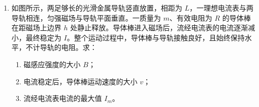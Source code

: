 \documentclass[\gkver]{gaokaozhenti}
\begin{document}
\begin{enumerate}
{（2）根据热力学第一定律 $\Delta U=W+Q$，第一阶段 $W_{1}=24\UkJ$，$\Delta U_{1}=0$，所以 $Q_{1}=-24\UkJ$，放热；第二阶段 $W_{2}=0$，放热 $Q_{2}=-5\UkJ$，所以 $\Delta U_{2}=-5\UkJ$。又 $\Delta U=\Delta U_{1}+\Delta U_{2}=-5\UkJ$，即内能减少 $5\UkJ$；$Q=Q_{1}+Q_{2}=-29\UkJ$，即放出热量 $29\UkJ$。

（3）设空气的摩尔质量为 $M$，在海底和岸上的密度分别为 $\rho_{\text{海}}$ 和 $\rho_{\text{岸}}$，一次吸入空气的体积为 $V$，则有 $\Delta n=\frac{(\rho_{\text{海}}-\rho_{\text{岸}})V}{M}N_{A}$，代入数据得 $\Delta n=3\times10^{22}$。

\textbf{B．}（1）测距利用的是平行度好的特点，答案 D。

（2）由于 $\frac{7.95}{5.30}=1.5$，路程差是半波长的奇数倍，所以是暗条纹。又 $\Delta x=\frac{l}{d}\lambda$，$\lambda$ 变大，$\Delta x$ 变大，条纹变宽。

（3）设折射角为 $\gamma$，由折射定律 $\frac{\sin i}{\sin\gamma}=n$；由几何关系 $l=2d\tan\gamma$，解得 $d=\frac{\sqrt{n^{2}-\sin^{2}i}}{2\sin i}l$。

\textbf{C．}（1）虽然 $I_{\text{强}}>I_{\text{弱}}$，但截止电压相等，选项 C 正确。

（2）减小；光电子受到金属表面层中力的阻碍作用（或需要克服逸出功）。

（3）氢原子放出的光子能量 $E=E_{3}-E_{2}$，代入数据得 $E=1.89\UeV$；金属钠的逸出功 $W_{0}=h\nu_{0}$，代入数据得 $W_{0}=2.3\UeV$。因为 $E<W_{0}$，所以不能发生光电效应。
}

\item
如图所示，两足够长的光滑金属导轨竖直放置，相距为 $L$，一理想电流表与两导轨相连，匀强磁场与导轨平面垂直。一质量为 $m$、有效电阻为 $R$ 的导体棒在距磁场上边界 $h$ 处静止释放。导体棒进入磁场后，流经电流表的电流逐渐减小，最终稳定为 $I$。整个运动过程中，导体棒与导轨接触良好，且始终保持水平，不计导轨的电阻。求：
\begin{enumerate}
	\item
	磁感应强度的大小 $B$；
	\item
	电流稳定后，导体棒运动速度的大小 $v$；
	\item
	流经电流表电流的最大值 $I_{m}$。
\end{enumerate}


\end{enumerate}
\end{document}
